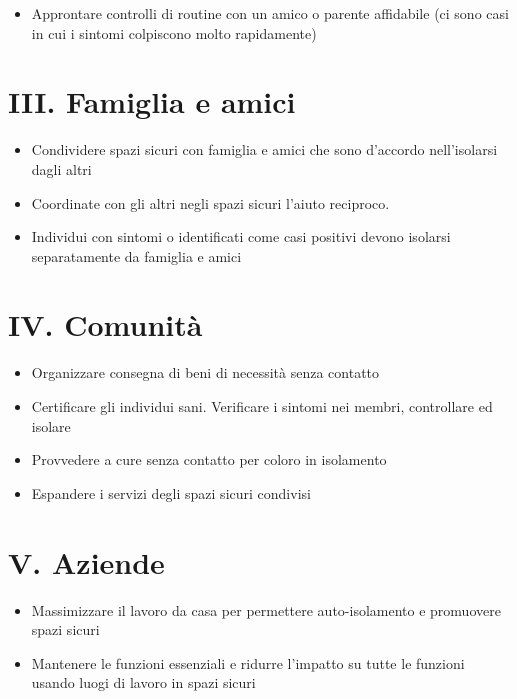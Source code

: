 \documentclass[onecolumn,journal]{IEEEtran}
\begin{document}
\begin{multicols}{2}
\begin{itemize}
\item Approntare controlli di routine con un amico o parente affidabile (ci sono casi in cui i sintomi colpiscono molto rapidamente)
\end{itemize}

\section*{III. Famiglia e amici}

\begin{itemize}
\item Condividere spazi sicuri con famiglia e amici che sono d'accordo nell'isolarsi dagli altri

\item Coordinate con gli altri negli spazi sicuri l'aiuto reciproco.

\item Individui con sintomi o identificati come casi positivi devono isolarsi separatamente da famiglia e amici
\end{itemize}


\section*{IV. Comunità}

\begin{itemize}
\item Organizzare consegna di beni di necessità senza contatto

\item Certificare gli individui sani. Verificare i sintomi nei membri, controllare ed isolare

\item Provvedere a cure senza contatto per coloro in isolamento

\item Espandere i servizi degli spazi sicuri condivisi

\end{itemize}



\section*{V. Aziende}

\begin{itemize}
\item Massimizzare il lavoro da casa per permettere auto-isolamento e promuovere spazi sicuri
\item Mantenere le funzioni essenziali e ridurre l'impatto su tutte le funzioni usando luogi di lavoro in spazi sicuri


\end{itemize}
\end{multicols}
\end{document}
